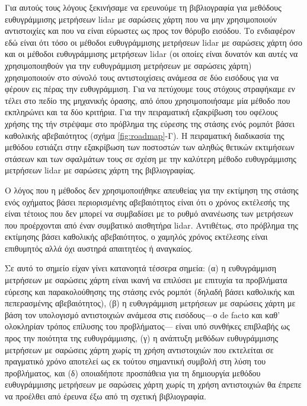 Για αυτούς τους λόγους ξεκινήσαμε να ερευνούμε τη βιβλιογραφία για μεθόδους
ευθυγράμμισης μετρήσεων lidar με σαρώσεις χάρτη που να μην χρησιμοποιούν
αντιστοιχίες και που να είναι εύρωστες ως προς τον θόρυβο εισόδου. Το
ενδιαφέρον εδώ είναι ότι τόσο οι μέθοδοι ευθυγράμμισης μετρήσεων lidar με
σαρώσεις χάρτη όσο και οι μέθοδοι ευθυγράμμισης μετρήσεων lidar (οι οποίες
είναι δυνατόν και αυτές να χρησιμοποιηθούν για την ευθυγράμμιση μετρήσεων με
σαρώσεις χάρτη) χρησιμοποιούν στο σύνολό τους αντιστοιχίσεις ανάμεσα σε δύο
εισόδους για να φέρουν εις πέρας την ευθυγράμμιση. Για να πετύχουμε τους
στόχους στραφήκαμε εν τέλει στο πεδίο της μηχανικής όρασης, από όπου
χρησιμοποιήσαμε μία μέθοδο που εκπληρώνει και τα δύο κριτήρια. Για την
πειραματική εξακρίβωση του οφέλους χρήσης της τήν στρέψαμε στο πρόβλημα της
εύρεσης της στάσης ενός ρομπότ βάσει καθολικής αβεβαιότητος (σχήμα
\ref{fig:roadmap}-Γ). Η πειραματική διαδικασία της μεθόδου εστιάζει στην
εξακρίβωση των ποστοστών των αληθώς θετικών εκτιμήσεων στάσεων και των
σφαλμάτων τους σε σχέση με την καλύτερη μέθοδο ευθυγράμμισης μετρήσεων lidar με
σαρώσεις χάρτη της βιβλιογραφίας.

Ο λόγος που η μέθοδος δεν χρησιμοποιήθηκε απευθείας για την εκτίμηση
της στάσης ενός οχήματος βάσει περιορισμένης αβεβαιότητος είναι ότι ο χρόνος
εκτέλεσής της είναι τέτοιος που δεν μπορεί να συμβαδίσει με το ρυθμό ανανέωσης
των μετρήσεων που προέρχονται από έναν συμβατικό αισθητήρα lidar. Αντιθέτως,
στο πρόβλημα της εκτίμησης βάσει καθολικής αβεβαιότητος, ο χαμηλός χρόνος
εκτέλεσης είναι επιθυμητός αλλά όχι αυστηρά απαιτητέος ή αναγκαίος.

Σε αυτό το σημείο είχαν γίνει κατανοητά τέσσερα σημεία: (α) η ευθυγράμμιση
μετρήσεων με σαρώσεις χάρτη είναι ικανή να επιλύσει με επιτυχία τα προβλήματα
εύρεσης και παρακολούθησης της στάσης ενός ρομπότ (δηλαδή βάσει καθολικής και
πεπερασμένης αβεβαιότητος), (β) η ευθυγράμμιση μετρήσεων με σαρώσεις χάρτη με
βάση τον υπολογισμό αντιστοιχιών ανάμεσα στις εισόδους---ο de factο και καθ'
ολοκληρίαν τρόπος επίλυσης του προβλήματος--- είναι υπό συνθήκες επιβλαβής ως
προς την ποιότητα της ευθυγράμμισης, (γ) η ανάπτυξη μεθόδων ευθυγράμμισης
μετρήσεων με σαρώσεις χάρτη χωρίς τη χρήση αντιστοιχιών που εκτελείται σε
πραγματικό χρόνο αποτελεί ως εκ τούτου σημαντική συμβολή στη λύση του
προβλήματος, και (δ) οποιαδήποτε προσπάθεια για τη δημιουργία μεθόδου
ευθυγράμμισης μετρήσεων με σαρώσεις χάρτη χωρίς τη χρήση αντιστοιχιών θα έπρεπε
να προέλθει από έρευνα έξω από τη σχετική βιβλιογραφία.

